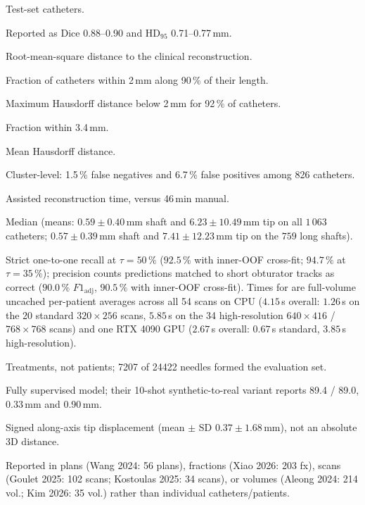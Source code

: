 \begin{table}[H]
\begin{threeparttable}
\begin{tablenotes}[flushleft]
\item[a] Test-set catheters. \item[b] Reported as Dice 0.88--0.90 and HD$_{95}$ 0.71--0.77\,mm. \item[c] Root-mean-square distance to the clinical reconstruction. \item[d] Fraction of catheters within 2\,mm along 90\,\% of their length. \item[e] Maximum Hausdorff distance below 2\,mm for 92\,\% of catheters. \item[f] Fraction within 3.4\,mm. \item[g] Mean Hausdorff distance. \item[h] Cluster-level: 1.5\,\% false negatives and 6.7\,\% false positives among 826 catheters. \item[i] Assisted reconstruction time, versus 46\,min manual. \item[j] Median (means: $0.59 \pm 0.40$\,mm shaft and $6.23 \pm 10.49$\,mm tip on all $1\,063$ catheters; $0.57 \pm 0.39$\,mm shaft and $7.41 \pm 12.23$\,mm tip on the $759$ long shafts). \item[k] Strict one-to-one recall at $\tau=50\,\%$ ($92.5\,\%$ with inner-OOF cross-fit; $94.7\,\%$ at $\tau=35\,\%$); precision counts predictions matched to short obturator tracks as correct ($90.0\,\%$ $F1_{\text{adj}}$, $90.5\,\%$ with inner-OOF cross-fit). Times for \NF{} are full-volume uncached per-patient averages across all 54 scans on CPU ($4.15$\,s overall: $1.26$\,s on the 20 standard $320\times256$ scans, $5.85$\,s on the 34 high-resolution $640\times416$ / $768\times768$ scans) and one RTX 4090 GPU ($2.67$\,s overall: $0.67$\,s standard, $3.85$\,s high-resolution). \item[l] Treatments, not patients; 7207 of 24422 needles formed the evaluation set. \item[m] Fully supervised model; their 10-shot synthetic-to-real variant reports 89.4 / 89.0, 0.33\,mm and 0.90\,mm. \item[n] Signed along-axis tip displacement (mean $\pm$ SD $0.37 \pm 1.68$\,mm), not an absolute 3D distance. \item[o] Reported in plans (Wang 2024: 56 plans), fractions (Xiao 2026: 203 fx), scans (Goulet 2025: 102 scans; Kostoulas 2025: 34 scans), or volumes (Aleong 2024: 214 vol.; Kim 2026: 35 vol.) rather than individual catheters/patients.
\end{tablenotes}
\end{threeparttable}
\end{table}
